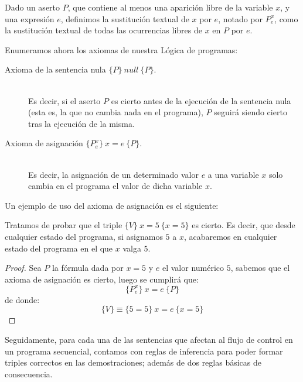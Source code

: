 \begin{definicion}
    Dado un aserto $P$, que contiene al menos una aparición libre de la variable $x$, y una expresión $e$, definimos la sustitución textual de $x$ por $e$, notado por $P_e^x$, como la sustitución textual de todas las ocurrencias libres de $x$ en $P$ por $e$.
\end{definicion}

Enumeramos ahora los axiomas de nuestra Lógica de programas:
\begin{description}
    \item [Axioma de la sentencia nula $\{P\}\ null\ \{P\}$.]~\\
        Es decir, si el aserto $P$ es cierto antes de la ejecución de la sentencia nula (esta es, la que no cambia nada en el programa), $P$ seguirá siendo cierto tras la ejecución de la misma.
    \item [Axioma de asignación $\{P_e^x\}\ x=e\ \{P\}$.]~\\
        Es decir, la asignación de un determinado valor $e$ a una variable $x$ solo cambia en el programa el valor de dicha variable $x$.
\end{description}

\begin{ejemplo}
    Un ejemplo de uso del axioma de asignación es el siguiente:

    Tratamos de probar que el triple $\{V\}\ x=5\ \{x=5\}$ es cierto. Es decir, que desde cualquier estado del programa, si asignamos $5$ a $x$, acabaremos en cualquier estado del programa en el que $x$ valga $5$.
    \begin{proof}
        Sea $P$ la fórmula dada por $x=5$ y $e$ el valor numérico $5$, sabemos que el axioma de asignación es cierto, luego se cumplirá que:
        \begin{equation*}
            \{P_e^x\}\ x=e\ \{P\}
        \end{equation*}
        de donde:
        \begin{equation*}
            \{V\} \equiv \{5=5\}\ x=e\ \{x=5\}
        \end{equation*}
        
    \end{proof}
\end{ejemplo}

Seguidamente, para cada una de las sentencias que afectan al flujo de control en un programa secuencial, contamos con reglas de inferencia para poder formar triples correctos en las demostraciones; además de dos reglas básicas de consecuencia.

